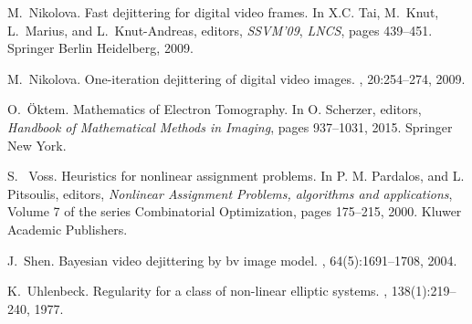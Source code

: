 \documentclass[runningheads,a4paper]{llncs}\usepackage{latexsym}
\begin{document}
\begin{thebibliography}{10}
M.~Nikolova.
\newblock Fast dejittering for digital video frames.
\newblock In X.C. Tai, M.~Knut, L.~Marius, and L.~Knut-Andreas, editors, {\em
  SSVM'09}, {\em LNCS}, pages 439--451. Springer Berlin
  Heidelberg, 2009.

M.~Nikolova.
\newblock One-iteration dejittering of digital video images.
, 20:254--274, 2009.

O.~\"Oktem.
\newblock Mathematics of Electron Tomography.
\newblock In O. Scherzer, editors, {\em Handbook of Mathematical Methods in Imaging}, pages 937--1031,
  2015. Springer New York.

S. ~Voss.
\newblock Heuristics for nonlinear assignment problems.
\newblock In P. M. Pardalos, and L. Pitsoulis, editors, {\em Nonlinear Assignment Problems, algorithms and applications}, Volume 7 of the series Combinatorial Optimization, pages 175--215,
  2000. Kluwer Academic Publishers.

J.~Shen.
\newblock Bayesian video dejittering by bv image model.
, 64(5):1691--1708, 2004.

K.~Uhlenbeck.
\newblock Regularity for a class of non-linear elliptic systems.
, 138(1):219--240, 1977.

\end{thebibliography}
\end{document}
